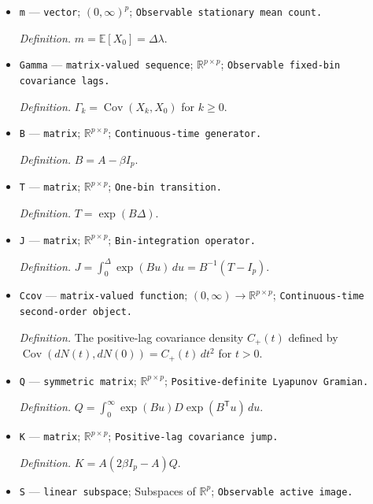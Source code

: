 \documentclass{article}
\begin{document}
\begin{itemize}
  \par\smallskip\noindent\emph{Definition.} \(X_k=N(((k+1)\Delta))-N(k\Delta)\).
  \item \texttt{m} --- \texttt{vector}; \((0,\infty)^p\); \texttt{Observable stationary mean count.}
  \par\smallskip\noindent\emph{Definition.} \(m=\mathbb E[X_0]=\Delta\lambda\).
  \item \texttt{Gamma} --- \texttt{matrix-\allowbreak{}valued sequence}; \(\mathbb R^{p\times p}\); \texttt{Observable fixed-\allowbreak{}bin covariance lags.}
  \par\smallskip\noindent\emph{Definition.} \(\Gamma_k=\operatorname{Cov}(X_k,X_0)\) for \(k\geq 0\).
  \item \texttt{B} --- \texttt{matrix}; \(\mathbb R^{p\times p}\); \texttt{Continuous-\allowbreak{}time generator.}
  \par\smallskip\noindent\emph{Definition.} \(B=A-\beta I_p\).
  \item \texttt{T} --- \texttt{matrix}; \(\mathbb R^{p\times p}\); \texttt{One-\allowbreak{}bin transition.}
  \par\smallskip\noindent\emph{Definition.} \(T=\exp(B\Delta)\).
  \item \texttt{J} --- \texttt{matrix}; \(\mathbb R^{p\times p}\); \texttt{Bin-\allowbreak{}integration operator.}
  \par\smallskip\noindent\emph{Definition.} \(J=\int_0^\Delta\exp(Bu)\,du=B^{-1}(T-I_p)\).
  \item \texttt{Ccov} --- \texttt{matrix-\allowbreak{}valued function}; \((0,\infty)\to\mathbb R^{p\times p}\); \texttt{Continuous-\allowbreak{}time second-\allowbreak{}order object.}
  \par\smallskip\noindent\emph{Definition.} The positive-lag covariance density \(C_{+}(t)\) defined by \(\operatorname{Cov}(dN(t),dN(0))=C_{+}(t)\,dt^2\) for \(t>0\).
  \item \texttt{Q} --- \texttt{symmetric matrix}; \(\mathbb R^{p\times p}\); \texttt{Positive-\allowbreak{}definite Lyapunov Gramian.}
  \par\smallskip\noindent\emph{Definition.} \(Q=\int_0^\infty\exp(Bu)D\exp(B^{\mathsf T}u)\,du\).
  \item \texttt{K} --- \texttt{matrix}; \(\mathbb R^{p\times p}\); \texttt{Positive-\allowbreak{}lag covariance jump.}
  \par\smallskip\noindent\emph{Definition.} \(K=A(2\beta I_p-A)Q\).
  \item \texttt{S} --- \texttt{linear subspace}; Subspaces of \(\mathbb R^p\); \texttt{Observable active image.}

\end{itemize}
\end{document}
